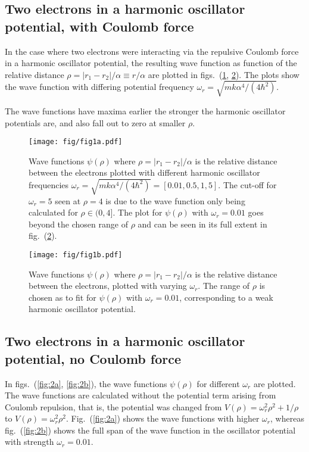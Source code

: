 \documentclass[a4paper,11pt]{article}
\begin{document}
\subsection{Two electrons in a harmonic oscillator potential, with Coulomb force}
In the case where two electrons were interacting via the repulsive Coulomb force in a harmonic oscillator potential, the resulting wave function as function of the relative distance $\rho = |r_1 - r_2|/\alpha \equiv r/\alpha$ are plotted in figs.~(\ref{fig:1a}, \ref{fig:1b}). The plots show the wave function with differing potential frequency $\omega_r = \sqrt{mk \alpha^4/(4 \hbar^2)}$. 

The wave functions have maxima earlier the stronger the harmonic oscillator potentials are, and also fall out to zero at smaller $\rho$.

\begin{figure}[htb]
    \centering
    \texttt{[image: fig/fig1a.pdf]}
    \caption{Wave functions $\psi(\rho)$ where $\rho = |r_1 - r_2|/\alpha$ is the relative distance between the electrons plotted with different harmonic oscillator frequencies $\omega_r = \sqrt{mk \alpha^4/(4 \hbar^2)} = [0.01, 0.5, 1, 5]$. The cut-off for $\omega_r = 5$ seen at $\rho=4$ is due to the wave function only being calculated for $\rho \in (0,4]$. The plot for $\psi(\rho)$ with $\omega_r = 0.01$ goes beyond the chosen range of $\rho$ and can be seen in its full extent in fig.~(\ref{fig:1b}).  }
    \label{fig:1a}
\end{figure}

\begin{figure}[htb]
    \centering
    \texttt{[image: fig/fig1b.pdf]}
    \caption{Wave functions $\psi(\rho)$ where $\rho = |r_1 - r_2|/\alpha$ is the relative distance between the electrons, plotted with varying $\omega_r$. The range of $\rho$ is chosen as to fit for $\psi(\rho)$ with $\omega_r = 0.01$, corresponding to a weak harmonic oscillator potential.}
    \label{fig:1b}
\end{figure}

\subsection{Two electrons in a harmonic oscillator potential, no Coulomb force}
In figs.~(\ref{fig:2a}, \ref{fig:2b}), the wave functions $\psi(\rho)$ for different $\omega_r$ are plotted. The wave functions are calculated without the potential term arising from Coulomb repulsion, that is, the potential was changed from $V(\rho) = \omega^2_r \rho^2 + 1/\rho$ to $V(\rho) = \omega^2_r \rho^2$. Fig.~(\ref{fig:2a}) shows the wave functions with higher $\omega_r$, whereas fig.~(\ref{fig:2b}) shows the full span of the wave function in the oscillator potential with strength $\omega_r = 0.01$. 
\end{document}
